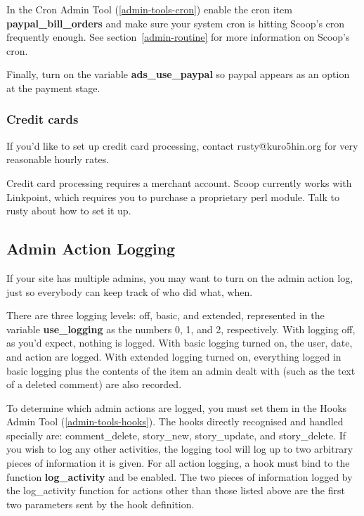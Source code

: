 In the Cron Admin Tool (\ref{admin-tools-cron}) enable the cron item {\bf paypal\_bill\_orders} and make sure your system cron is hitting Scoop's cron frequently enough. See section~\ref{admin-routine} for more information on Scoop's cron.

Finally, turn on the variable {\bf ads\_use\_paypal} so paypal appears as an option at the payment stage.


\subsubsection{Credit cards}

If you'd like to set up credit card processing, contact rusty@kuro5hin.org for very reasonable hourly rates.

Credit card processing requires a merchant account. Scoop currently works with Linkpoint, which requires you to purchase a proprietary perl module. Talk to rusty about how to set it up.

\subsection{Admin Action Logging}
\label{features-admin-action-log}

If your site has multiple admins, you may want to turn on the admin action log, just so everybody can keep track of who did what, when.

There are three logging levels: off, basic, and extended, represented in the variable {\bf use\_logging} as the numbers 0, 1, and 2, respectively.  With logging off, as you'd expect, nothing is logged.  With basic logging turned on, the user, date, and action are logged.  With extended logging turned on, everything logged in basic logging plus the contents of the item an admin dealt with (such as the text of a deleted comment) are also recorded.

To determine which admin actions are logged, you must set them in the Hooks Admin Tool (\ref{admin-tools-hooks}).  The hooks directly recognised and handled specially are: comment\_delete, story\_new, story\_update, and story\_delete.  If you wish to log any other activities, the logging tool will log up to two arbitrary pieces of information it is given.  For all action logging, a hook must bind to the function {\bf log\_activity} and be enabled.  The two pieces of information logged by the log\_activity function for actions other than those listed above are the first two parameters sent by the hook definition.

